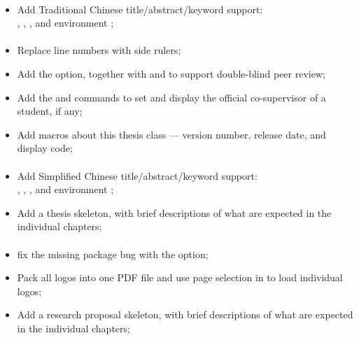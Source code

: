 \paragraph{}
	\begin{itemize}[noitemsep]
        \item Add Traditional Chinese title/abstract/keyword support: \\
            , , , and environment ;
	\end{itemize}

\paragraph{}
	\begin{itemize}[noitemsep]
        \item Replace line numbers with side rulers;

        \item Add the  option, together with  and  to support double-blind peer review;

        \item Add the  and  commands to set and display the official co-supervisor of a student, if any;

        \item Add macros about this thesis class --- version number, release date, and display code;
	\end{itemize}

\paragraph{}
	\begin{itemize}[noitemsep]
        \item Add Simplified Chinese title/abstract/keyword support: \\
            , , , and environment ;

        \item Add a thesis skeleton, with brief descriptions of what are expected in the individual chapters;
	\end{itemize}

\paragraph{}
	\begin{itemize}[noitemsep]
        \item fix the missing package bug with the  option;

        \item Pack all logos into one PDF file and use page selection in  to load individual logos;

        \item Add a research proposal skeleton, with brief descriptions of what are expected in the individual chapters;
	\end{itemize}

